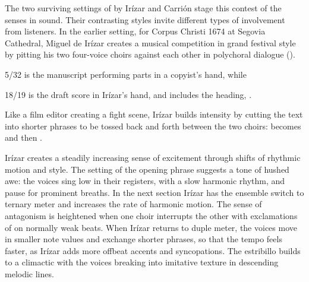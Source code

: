 The two surviving settings of  by Irízar and Carrión stage this contest of the senses in sound.
Their contrasting styles invite different types of involvement from listeners.
In the earlier setting, for Corpus Christi 1674 at Segovia Cathedral, Miguel de Irízar creates a musical competition in grand festival style by pitting his two four-voice choirs against each other in polychoral dialogue ().%
  \begin{Footnote}
  \signature{E-SE}{5/32} is the manuscript performing parts in a copyist's hand, while \signature{E-SE}{18/19} is the draft score in Irízar's hand, and includes the heading, .
  \end{Footnote}
Like a film editor creating a fight scene, Irízar builds intensity by cutting the text into shorter phrases to be tossed back and forth between the two choirs:  becomes  and then . 


Irízar creates a steadily increasing sense of excitement through shifts of rhythmic motion and style.
The setting of the opening phrase suggests a tone of hushed awe: the voices sing low in their registers, with a slow harmonic rhythm, and pause for prominent breaths.
In the next section Irízar has the ensemble switch to ternary meter and increases the rate of harmonic motion.
The sense of antagonism is heightened when one choir interrupts the other with exclamations of  on normally weak beats.
When Irízar returns to duple meter, the voices move in smaller note values and exchange shorter phrases, so that the tempo feels faster, as Irízar adds more offbeat accents and syncopations.
The estribillo builds to a climactic  with the voices breaking into imitative texture in descending melodic lines.

